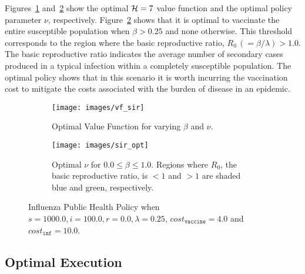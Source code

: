 Figures~\ref{fig:sir_vf} and~\ref{fig:sir_opt} show the optimal {\footnotesize $ \mathcal{H} = 7 $} value function and the optimal policy parameter {\footnotesize $ \nu $}, respectively. Figure~\ref{fig:sir_opt} shows that it is optimal to vaccinate the entire susceptible population when {\footnotesize $ \beta > 0.25 $} and none otherwise. This threshold corresponds to the region where the  basic reproductive ratio, {\footnotesize $ R_0 \,(= \beta/\lambda) > 1.0$}. The basic reproductive ratio indicates the average number of secondary cases produced in a typical infection within a completely susceptible population. The optimal policy shows that in this scenario it is worth incurring the vaccination cost to mitigate the costs associated with the burden of disease in an epidemic.

\begin{figure}[h!]
    \centering
    \begin{subfigure}[b]{0.4\textwidth}    
        \centering
        \texttt{[image: images/vf\_sir]}
        \caption{Optimal Value Function for varying {\footnotesize $ \beta $} and {\footnotesize $ \nu $}.}
        \label{fig:sir_vf}
        \vspace{1em}
       \end{subfigure}         
    \begin{subfigure}[b]{0.4\textwidth}    
        \centering
        \texttt{[image: images/sir\_opt]}
        \caption{Optimal {\footnotesize $ \nu $} for {\footnotesize $ 0.0 \leq \beta \leq 1.0 $}. Regions where $ R_0 $, the basic reproductive ratio, is $ < 1 $ and $ > 1 $ are shaded blue and green, respectively. }
        \label{fig:sir_opt}
     \end{subfigure}         
    \caption{Influenza Public Health Policy when {\footnotesize $ s = 1000.0, i = 100.0, r = 0.0, \lambda = 0.25 $}, {\footnotesize $ cost_{\mathtt{vaccine}} = 4.0$} and {\footnotesize $ cost_{\mathtt{inf}} = 10.0 $}.}
    \label{fig:sir}    
\end{figure}

\subsection{Optimal Execution}
\label{sec:results_oe}

